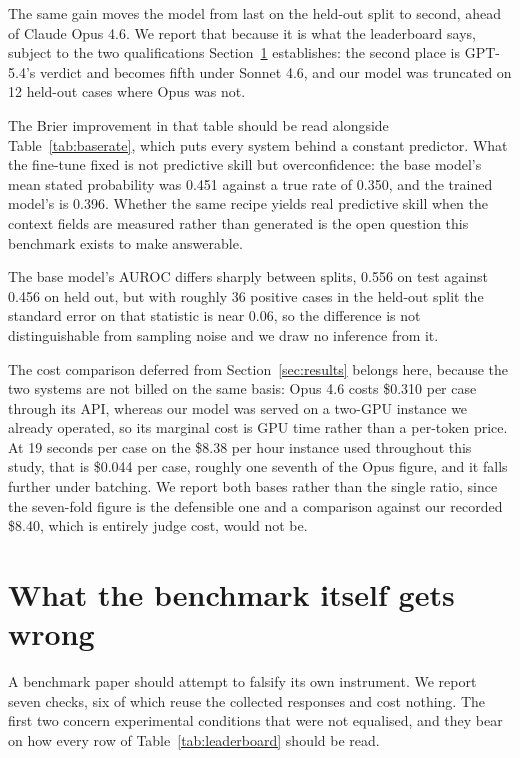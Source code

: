 \documentclass[11pt]{article}
\begin{document}
The same gain moves the model from last on the held-out split to second, ahead of
Claude Opus 4.6. We report that because it is what the leaderboard says, subject
to the two qualifications Section~\ref{sec:robustness} establishes: the second
place is GPT-5.4's verdict and becomes fifth under Sonnet 4.6, and our model was
truncated on 12 held-out cases where Opus was not.

The Brier improvement in that table should be read alongside
Table~\ref{tab:baserate}, which puts every system behind a constant predictor.
What the fine-tune fixed is not predictive skill but overconfidence: the base
model's mean stated probability was 0.451 against a true rate of 0.350, and the
trained model's is 0.396. Whether the same recipe yields real predictive skill
when the context fields are measured rather than generated is the open question
this benchmark exists to make answerable.

The base model's AUROC differs sharply between splits, 0.556 on test against
0.456 on held out, but with roughly 36 positive cases in the held-out split the
standard error on that statistic is near 0.06, so the difference is not
distinguishable from sampling noise and we draw no inference from it.

The cost comparison deferred from Section~\ref{sec:results} belongs here,
because the two systems are not billed on the same basis: Opus 4.6 costs \$0.310
per case through its API, whereas our model was served on a two-GPU instance we
already operated, so its marginal cost is GPU time rather than a per-token price.
At 19 seconds per case on the \$8.38 per hour instance used throughout this
study, that is \$0.044 per case, roughly one seventh of the Opus figure, and it
falls further under batching. We report both bases rather than the single ratio, since the
seven-fold figure is the defensible one and a comparison against our recorded
\$8.40, which is entirely judge cost, would not be.


\section{What the benchmark itself gets wrong}
\label{sec:robustness}


A benchmark paper should attempt to falsify its own instrument. We report seven
checks, six of which reuse the collected responses and cost nothing. The first
two concern experimental conditions that were not equalised, and they bear on how
every row of Table~\ref{tab:leaderboard} should be read.
\end{document}
